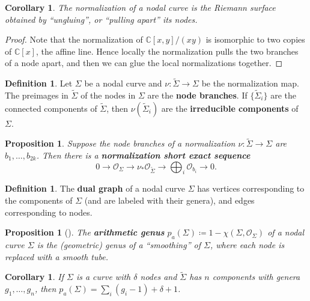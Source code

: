 \documentclass{report}
\theoremstyle{plain}
\newtheorem{proposition}[theorem]{Proposition}
\newtheorem{corollary}[theorem]{Corollary}
\theoremstyle{definition}
\newtheorem{definition}[theorem]{Definition}
\theoremstyle{remark}
\newcommand{\bC}{\mathbb{C}}
\newcommand{\cO}{\mathcal{O}}
\begin{document}
\begin{corollary}
  The normalization of a nodal curve is the Riemann surface obtained
  by ``ungluing'', or ``pulling apart'' its nodes.
\end{corollary}

\begin{proof}
  Note that the normalization of $\bC[x,y]/(xy)$ is isomorphic to two
  copies of $\bC[x]$, the affine line. Hence locally the normalization
  pulls the two branches of a node apart, and then we can glue the
  local normalizations together.
\end{proof}

\begin{definition}
  Let $\Sigma$ be a nodal curve and $\nu\colon\tilde\Sigma \to \Sigma$
  be the normalization map. The preimages in $\tilde{\Sigma}$ of the
  nodes in $\Sigma$ are the {\bf node branches}. If
  $\{\tilde\Sigma_i\}$ are the connected components of $\tilde\Sigma$,
  then $\nu(\tilde\Sigma_i)$ are the {\bf irreducible components} of
  $\Sigma$.
\end{definition}

\begin{proposition}{{\cite[Exercise IV.1.8]{Hartshorne1997}}}
  Suppose the node branches of a normalization $\nu\colon \tilde\Sigma
  \to \Sigma$ are $b_1, \ldots, b_{2k}$. Then there is a {\bf
    normalization short exact sequence}
  \[ 0 \to \cO_\Sigma \to \nu_*\cO_{\tilde\Sigma} \to \bigoplus_i \cO_{b_i} \to 0. \]
\end{proposition}

\begin{definition}
  The {\bf dual graph} of a nodal curve $\Sigma$ has vertices
  corresponding to the components of $\Sigma$ (and are labeled with
  their genera), and edges corresponding to nodes.
\end{definition}

\begin{proposition}[{\cite[Corollary V.5.6]{Hartshorne1997}}] \label{thm:nodal-curve-arithmetic-genus}
  The {\bf arithmetic genus} $p_a(\Sigma) \coloneqq 1 - \chi(\Sigma,
  \cO_\Sigma)$ of a nodal curve $\Sigma$ is the (geometric) genus of a
  ``smoothing'' of $\Sigma$, where each node is replaced with a smooth
  tube.
\end{proposition}

\begin{corollary} \label{thm:genus-of-nodal-curve-from-normalization}
  If $\Sigma$ is a curve with $\delta$ nodes and $\tilde\Sigma$ has
  $n$ components with genera $g_1, \ldots, g_n$, then $p_a(\Sigma) =
  \sum_i (g_i - 1) + \delta + 1$.
\end{corollary}
\end{document}
